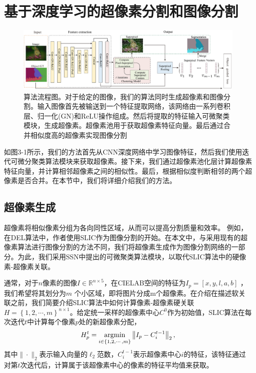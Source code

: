 
\chapter{基于深度学习的超像素分割和图像分割}

\begin{figure}[h]
\begin{center}
\includegraphics[width=1\textwidth]{figures/img/pipeline.pdf}
\end{center}
\vspace{-5mm}
\caption{算法流程图。对于给定的图像，我们的算法同时生成超像素和图像分割。输入图像首先被输送到一个特征提取网络，该网络由一系列卷积层、归一化(GN)和ReLU操作组成。然后将提取的特征输入可微聚类模块，生成超像素。超像素池用于获取超像素特征向量。最后通过合并相似度高的超像素实现图像分割}
\label{Fig.sub.1}
\end{figure}

如图3-1所示，我们的方法首先从CNN深度网络中学习图像特征，然后我们使用迭代可微分聚类算法模块来获取超像素。接下来，我们通过超像素池化层计算超像素特征向量，并计算相邻超像素之间的相似性。最后，根据相似度判断相邻的两个超像素是否合并。在本节中，我们将详细介绍我们的方法。

\section{超像素生成}

超像素将相似像素分组为各向同性区域，从而可以提高分割质量和效率。 例如，在DEL算法中，作者使用SLIC作为图像分割的开始。在本文中，与采用现有的超像素算法进行图像分割的方法不同，我们将超像素生成作为图像分割网络的一部分。为此，我们采用SSN中提出的可微聚类算法模块，以取代SLIC算法中的硬像素-超像素关联。

通常，对于$n$像素的图像\(I\in\mathbb{R}^{n\times 5}\)，在CIELAB空间的特征为$I_p=[x,y,l,a,b]$ ，我们希望将其划分为$m$ 个小区域，即将图片分成m个超像素。在介绍在描述软关联之前，我们简要介绍SLIC算法中如何计算像素-超像素硬关联$H = \left \{1, 2, \cdots, m \right \}^{n\times 1}$。给定统一采样的超像素中心$C^{0}$作为初始值，SLIC算法在每次迭代$t$中计算每个像素$p$处的新超像素分配，
\begin{equation}\label{eqn:hardassn}
H_{p}^{t} =  \mathop{{{\rm argmin}}}\limits_{{i\in\{ 1, 2, \cdots ,m \} }}\left\|I_{p}-C_{i}^{t-1}\right\|_2,
\end{equation}
其中$\|\cdot\|_2$表示输入向量的$\ell_2$范数，$C_i^{t-1}$表示超像素中心$i$的特征，该特征通过对第$t$次迭代后，计算属于该超像素中心的像素的特征平均值来获取。

